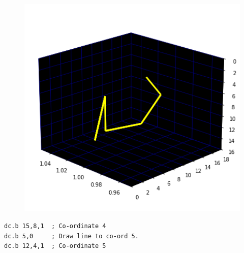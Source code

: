 \begin{minipage}[c]{0.48\linewidth}
\begin{figure}[H]
    \centering
    \begin{adjustbox}{width=5.5cm,center}
      \includegraphics[width=12cm]{src/claws/build_claw_4_0.png}%
    \end{adjustbox}
\end{figure}
\end{minipage}
\begin{minipage}[c]{0.48\linewidth}
\begin{lstlisting}[basicstyle=\scriptsize\ttfamily]
dc.b 15,8,1  ; Co-ordinate 4
dc.b 5,0     ; Draw line to co-ord 5.
dc.b 12,4,1  ; Co-ordinate 5
\end{lstlisting}
\vspace*{\fill}
\end{minipage}

